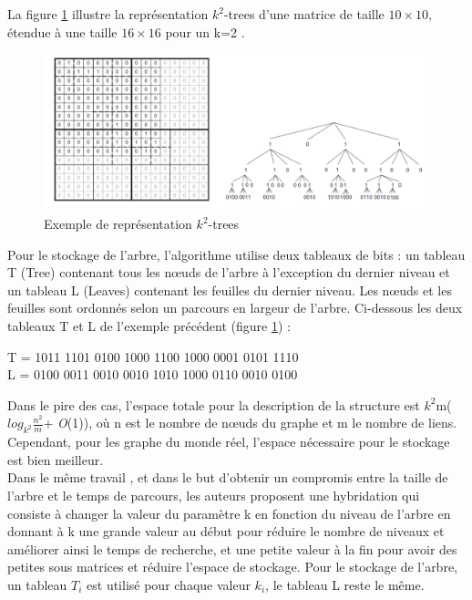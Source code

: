 La figure \ref{k2-trees-exemples} illustre la représentation $k^2$-trees d'une matrice de taille $10 \times 10$, étendue à une  taille $16 \times 16$ pour un k=2 \citep{brisaboa2015efficient}.

\begin{figure}[H]
\begin{center}
\includegraphics[height=200 pt, width=450 pt]{./ressources/image/k2-trees.png} 
\end{center}
\caption{Exemple de représentation $k^2$-trees}
\label{k2-trees-exemples}
\end{figure}


Pour le stockage de l'arbre, l'algorithme utilise deux tableaux de bits : un tableau T (Tree) contenant tous les nœuds de l'arbre à l'exception du dernier niveau et un tableau L (Leaves) contenant les feuilles du dernier niveau. Les nœuds et les feuilles sont ordonnés selon un parcours en largeur de l'arbre.   
Ci-dessous les deux tableaux T et L de l'exemple précédent (figure \ref{k2-trees-exemples}) : \\
\begin{center}
	T = 1011 1101 0100 1000 1100 1000 0001 0101 1110\\
	L = 0100 0011 0010 0010 1010 1000 0110 0010 0100\\	
\end{center}
Dans le pire des cas, l'espace totale pour la description de la structure est $k^2$m($log_{k^2}\frac{n^2}{m}$+ \textit{O}(1)), où n est le nombre de nœuds du graphe et m le nombre de liens. Cependant, pour les graphe du monde réel, l'espace nécessaire pour le stockage est bien meilleur. \\

Dans le même travail \citep{brisaboa2009k}, et dans le but d'obtenir un compromis entre la taille de l'arbre et le temps de parcours, les auteurs proposent une hybridation qui consiste à changer la valeur du paramètre k en fonction du niveau de l'arbre en donnant à k une grande valeur au début pour réduire le nombre de niveaux et améliorer ainsi le temps de recherche, et une petite valeur à la fin pour avoir des petites sous matrices et réduire l'espace de stockage.
Pour le stockage de l'arbre, un tableau $T_{i}$ est utilisé pour chaque valeur $k_{i}$, le tableau L reste le même.\\

